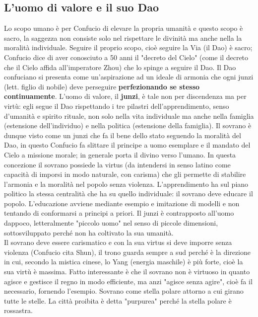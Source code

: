 \documentclass[10pt,a4paper]{report}
\begin{document}
\subsection{L'uomo di valore e il suo Dao}
Lo scopo umano è per Confucio di elevare la propria umanità e questo scopo è sacro, la saggezza non consiste solo nel rispettare le divinità ma anche nella la moralità individuale. Seguire il proprio scopo, cioè seguire la Via (il Dao) è sacro; Confucio dice di aver conosciuto a 50 anni il "decreto del Cielo" (come il decreto che il Cielo affida all'imperatore Zhou) che lo spinge a seguire il Dao.
Il Dao confuciano si presenta come un'aspirazione ad un ideale di armonia che ogni junzi (lett. figlio di nobile) deve perseguire \textbf{perfezionando se stesso continuamente}. L'uomo di valore, il \textbf{junzi}, è tale non per discendenza ma per virtù: egli segue il Dao rispettando i tre pilastri dell'apprendimento, senso d'umanità e spirito rituale, non solo nella vita individuale ma anche nella famiglia (estensione dell'individuo) e nella politica (estensione della famiglia). Il sovrano è dunque visto come un junzi che fa il bene dello stato seguendo la moralità del Dao, in questo Confucio fa slittare il principe a uomo esemplare e il mandato del Cielo a missione morale; in generale porta il divino verso l'umano. In questa concezione il sovrano possiede la virtus (da intendersi in senso latino come capacità di imporsi in modo naturale, con carisma) che gli permette di stabilire l'armonia e la moralità nel popolo senza violenza. L'apprendimento ha sul piano politico la stessa centralità che ha su quello individuale: il sovrano deve educare il popolo. L'educazione avviene mediante esempio e imitazione di modelli e non tentando di conformarsi a principi a priori. Il junzi è contrapposto all'uomo dappoco, letteralmente "piccolo uomo" nel senso di piccole dimensioni, sottosviluppato perché non ha coltivato la sua umanità.\\
Il sovrano deve essere carismatico e con la sua virtus si deve imporre senza violenza (Confucio cita Shun), il trono guarda sempre a sud perché è la direzione in cui, secondo la mistica cinese, lo Yang (energia maschile) è più forte, cioè la sua virtù è massima. Fatto interessante è che il sovrano non è virtuoso in quanto agisce e gestisce il regno in modo efficiente, ma anzi "agisce senza agire", cioè fa il necessario, fornendo l'esempio. Sovrano come stella polare attorno a cui girano tutte le stelle. La città proibita è detta "purpurea" perché la stella polare è rossastra.  
\end{document}
